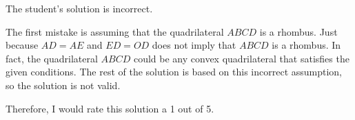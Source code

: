 The student's solution is incorrect.

The first mistake is assuming that the quadrilateral $ABCD$ is a rhombus. Just because $AD = AE$ and $ED = OD$ does not imply that $ABCD$ is a rhombus. In fact, the quadrilateral $ABCD$ could be any convex quadrilateral that satisfies the given conditions. The rest of the solution is based on this incorrect assumption, so the solution is not valid.

Therefore, I would rate this solution a 1 out of 5.
